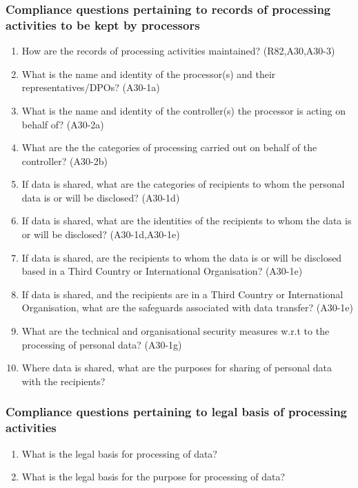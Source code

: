 \subsubsection{Compliance questions pertaining to records of processing activities to be kept by processors}
\begin{enumerate}[label={\textit{CMQ.\theenumi}},resume]
    \item How are the records of processing activities maintained? (R82,A30,A30-3)
    \item What is the name and identity of the processor(s) and their representatives/DPOs? (A30-1a)
    \item What is the name and identity of the controller(s) the processor is acting on behalf of? (A30-2a)
    \item What are the the categories of processing carried out on behalf of the controller? (A30-2b)
    \item If data is shared, what are the categories of recipients to whom the personal data is or will be disclosed? (A30-1d)
    \item If data is shared, what are the identities of the recipients to whom the data is or will be disclosed? (A30-1d,A30-1e)
    \item If data is shared, are the recipients to whom the data is or will be disclosed based in a Third Country or International Organisation? (A30-1e)
    \item If data is shared, and the recipients are in a Third Country or International Organisation, what are the safeguards associated with data transfer? (A30-1e)
    \item What are the technical and organisational security measures w.r.t to the processing of personal data? (A30-1g)
    \item Where data is shared, what are the purposes for sharing of personal data with the recipients?
\end{enumerate}
\subsubsection{Compliance questions pertaining to legal basis of processing activities}
\begin{enumerate}[label={\textit{CMQ.\theenumi}},resume]
    \item What is the legal basis for processing of data?
    \item What is the legal basis for the purpose for processing of data?
\end{enumerate}

